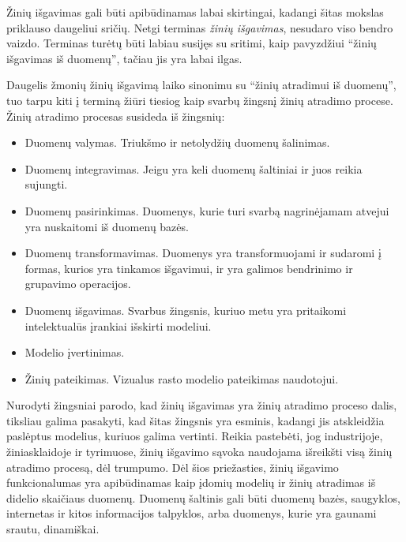 Žinių išgavimas gali būti apibūdinamas labai skirtingai, kadangi šitas mokslas priklauso daugeliui sričių.
Netgi terminas \textit{žinių išgavimas}, nesudaro viso bendro vaizdo.
Terminas turėtų būti labiau susijęs su sritimi, kaip pavyzdžiui ``žinių išgavimas iš duomenų'', tačiau jis yra labai ilgas.

Daugelis žmonių žinių išgavimą laiko sinonimu su ``žinių atradimui iš duomenų'', tuo tarpu kiti į terminą žiūri tiesiog kaip svarbų žingsnį žinių atradimo procese. Žinių atradimo procesas susideda iš žingsnių:

\begin{itemize}
    \item Duomenų valymas. Triukšmo ir netolydžių duomenų šalinimas.
    \item Duomenų integravimas. Jeigu yra keli duomenų šaltiniai ir juos reikia sujungti.
    \item Duomenų pasirinkimas. Duomenys, kurie turi svarbą nagrinėjamam atvejui yra nuskaitomi iš duomenų bazės.
    \item Duomenų transformavimas. Duomenys yra transformuojami ir sudaromi į formas, kurios yra tinkamos išgavimui, ir yra galimos bendrinimo ir grupavimo operacijos.
    \item Duomenų išgavimas. Svarbus žingsnis, kuriuo metu yra pritaikomi intelektualūs įrankiai išskirti modeliui.
    \item Modelio įvertinimas. 
    \item Žinių pateikimas. Vizualus rasto modelio pateikimas naudotojui.
\end{itemize}

Nurodyti žingsniai parodo, kad žinių išgavimas yra žinių atradimo proceso dalis, tiksliau galima pasakyti, kad šitas žingsnis yra esminis, kadangi jis atskleidžia paslėptus modelius, kuriuos galima vertinti.
Reikia pastebėti, jog industrijoje, žiniasklaidoje ir tyrimuose, žinių išgavimo sąvoka naudojama išreikšti visą žinių atradimo procesą, dėl trumpumo.
Dėl šios priežasties, žinių išgavimo funkcionalumas yra apibūdinamas kaip įdomių modelių ir žinių atradimas iš didelio skaičiaus duomenų.
Duomenų šaltinis gali būti duomenų bazės, saugyklos, internetas ir kitos informacijos talpyklos, arba duomenys, kurie yra gaunami srautu, dinamiškai.